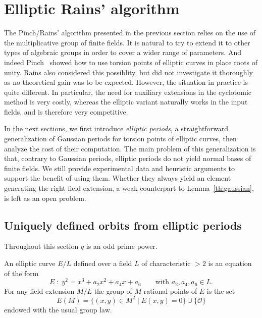 \documentclass[12pt]{article}
\theoremstyle{plain}
\theoremstyle{definition}
\newcounter{algorithm}
\begin{document}

\section{Elliptic Rains' algorithm}
\label{sec:rains-elliptic}

The Pinch/Rains' algorithm presented in the previous section relies on the use
of the multiplicative group of finite fields.
It is natural to try to extend it to other types of algebraic groups in
order to cover a wider range of parameters.
And indeed Pinch~\cite{Pinch} showed how to use torsion points of elliptic
curves in place roots of unity.
Rains also considered this possiblity, but did not investigate it thoroughly
as no theoretical gain was to be expected.
However, the situation in practice is quite different.
In particular, the need for auxiliary extensions in the cyclotomic method
is very costly, whereas the elliptic variant naturally works in the input 
fields, and is therefore very competitive.

In the next sections, we first introduce \emph{elliptic periods}, a
straightforward generalization of Gaussian periods for torsion points
of elliptic curves,
then analyze the cost of their computation.
The main problem of this generalization is that, contrary to Gaussian periods,
elliptic periods do not yield normal bases of finite fields.
We still provide experimental data and heuristic arguments to support the benefit
of using them.
Whether they always yield an element generating the right field extension,
a weak counterpart to Lemma~\ref{th:gaussian}, is left as an open problem.

\subsection{Uniquely defined orbits from elliptic periods}

Throughout this section $q$ is an odd prime power. 

An elliptic curve $E/L$ defined over a field $L$ of characteristic
$>2$ is an equation of the form
\begin{equation*}
  E\;:\; y^2 = x^3 + a_2x^2 + a_4x + a_6
  \qquad\text{with $a_2,a_4,a_6\in L$.}
\end{equation*}
For any field extension $M/L$ the group of $M$-rational points of $E$
is the set
\begin{equation*}
  E(M) = \{(x,y)\in M^2 \mid E(x,y) = 0\} \cup \{\mathcal{O}\}
\end{equation*}
endowed with the usual group law.
\end{document}
